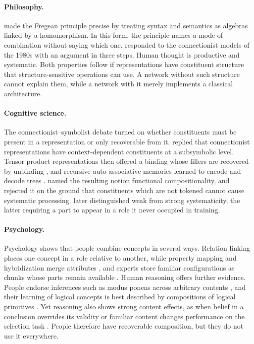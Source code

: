 \documentclass{article}
\theoremstyle{definition}
\theoremstyle{plain}
\theoremstyle{remark}
\begin{document}
\paragraph{Philosophy.} \citet{montague1970} made the Fregean principle
precise by treating syntax and semantics as algebras linked by a
homomorphism. In this form, the principle names a mode of combination
without saying which one. \citet{fodor1988} responded to the
connectionist models of the 1980s \citep{rumelhart1986} with an
argument in three steps. Human thought is productive and systematic.
Both properties follow if representations have constituent structure
that structure-sensitive operations can use. A network without such
structure cannot explain them, while a network with it merely
implements a classical architecture.

\paragraph{Cognitive science.} The connectionist--symbolist debate
turned on whether constituents must be present in a representation or
only recoverable from it. \citet{smolensky1987,smolensky1988} replied
that connectionist representations have context-dependent constituents
at a subsymbolic level. Tensor product representations then offered a
binding whose fillers are recovered by unbinding \citep{smolensky1990},
and recursive auto-associative memories learned to encode and decode
trees \citep{pollack1990}. \citet{vangelder1990} named the resulting
notion functional compositionality, and \citet{fodor1990} rejected it
on the ground that constituents which are not tokened cannot cause
systematic processing. \citet{hadley1994} later distinguished weak
from strong systematicity, the latter requiring a part to appear in a
role it never occupied in training.

\paragraph{Psychology.} Psychology shows that people combine concepts
in several ways. Relation linking places one concept in a role relative
to another, while property mapping and hybridization merge attributes
\citep{wisniewski1997,hampton1987}, and experts store familiar
configurations as chunks whose parts remain available
\citep{chase1973,gobet2000}. Human reasoning offers further evidence.
People endorse inferences such as modus ponens across arbitrary
contents \citep{rips1994}, and their learning of logical concepts is
best described by compositions of logical primitives
\citep{piantadosi2016}. Yet reasoning also shows strong content
effects, as when belief in a conclusion overrides its validity
\citep{evans1983} or familiar content changes performance on the
selection task \citep{wason1968}. People therefore have recoverable
composition, but they do not use it everywhere.
\end{document}
